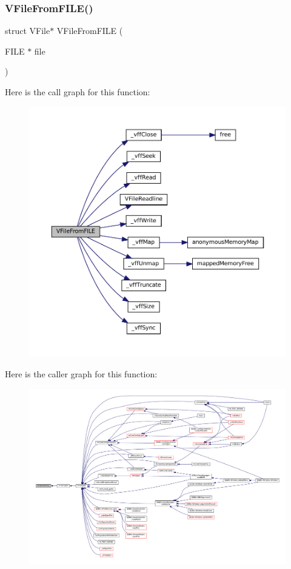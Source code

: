 \subsubsection{\texorpdfstring{V\+File\+From\+F\+I\+L\+E()}{VFileFromFILE()}}
{\footnotesize\ttfamily struct V\+File$\ast$ V\+File\+From\+F\+I\+LE (\begin{DoxyParamCaption}\item[{F\+I\+LE $\ast$}]{file }\end{DoxyParamCaption})}

Here is the call graph for this function\+:
\nopagebreak
\begin{figure}[H]
\begin{center}
\leavevmode
\includegraphics[width=350pt]{vfs-file_8c_a6f6240220a6b709b7f112e86590c0f68_cgraph}
\end{center}
\end{figure}
Here is the caller graph for this function\+:
\nopagebreak
\begin{figure}[H]
\begin{center}
\leavevmode
\includegraphics[width=350pt]{vfs-file_8c_a6f6240220a6b709b7f112e86590c0f68_icgraph}
\end{center}
\end{figure}
